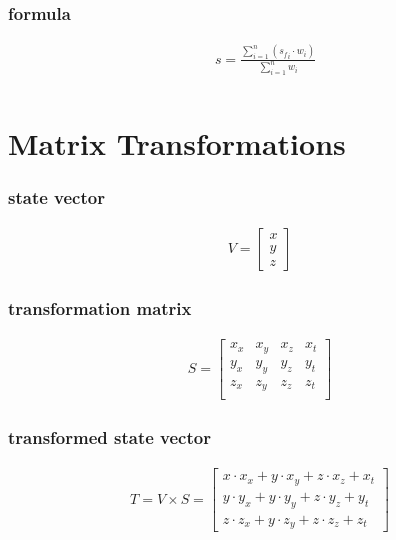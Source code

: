 \subsubsection{formula}

\begin{align*}
    &s = \frac{\sum\limits_{i=1}^{n}({s_f}_i \cdot w_i)}{\sum\limits_{i=1}^{n}w_i} \\
\end{align*}

\section{Matrix Transformations}\label{ax:math:matrix}

\subsubsection{state vector}

\begin{align*}
	V = \begin{bmatrix}
		x \\
		y \\
		z
	\end{bmatrix}
\end{align*}

\subsubsection{transformation matrix}

\begin{align*}
	S = \begin{bmatrix}
		x_x & x_y & x_z & x_t \\
		y_x & y_y & y_z & y_t \\
		z_x & z_y & z_z & z_t \\
	\end{bmatrix}
\end{align*}

\subsubsection{transformed state vector}

\begin{align*}
	T = V \times S = \begin{bmatrix}
		x \cdot x_x + y \cdot x_y + z \cdot x_z + x_t\\
		y \cdot y_x + y \cdot y_y + z \cdot y_z + y_t\\
		z \cdot z_x + y \cdot z_y + z \cdot z_z + z_t
	\end{bmatrix}
\end{align*}

